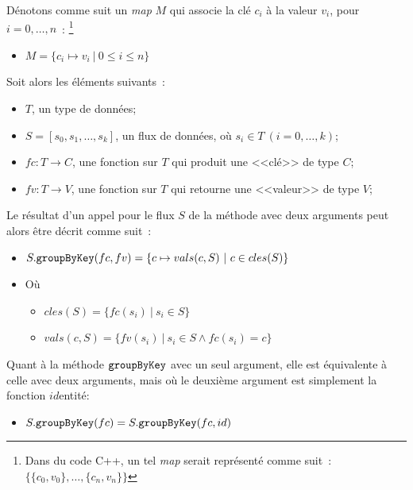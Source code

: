D\'enotons comme suit un \emph{map} $M$ qui associe la cl\'e $c_i$ \`a
la valeur $v_i$, pour $i=0, \ldots, n$~:%
%
\footnote{Dans du code C++, un tel \emph{map} serait repr\'esent\'e
comme suit~: $\{\{c_0, v_0\}, \ldots, \{c_n, v_n\}\}$}
%
\begin{itemize}
\item $M = \{ c_i \mapsto v_i~\vert~0 \leq i \leq n \}$
\end{itemize}

Soit alors les \'el\'ements suivants~: 
\begin{itemize}
\item $T$, un type de donn\'ees;

\item $S = [s_0, s_1, \ldots, s_k]$, un flux de donn\'ees, o\`u $s_i
\in T~(i=0, \ldots, k)$;

\item $fc: T \rightarrow C$, une fonction sur  $T$ qui produit une
<<cl\'e>> de type $C$;

\item $fv: T \rightarrow V$, une fonction sur $T$ qui retourne une
<<valeur>> de type $V$;


\end{itemize}


Le r\'esultat d'un appel pour le flux $S$ de la m\'ethode
 avec deux arguments peut alors \^etre d\'ecrit comme
suit~:
%
\begin{itemize}
\item $S.{\tt groupByKey}(fc, fv) = \{ c \mapsto vals(c, S)~\vert~c \in
cles(S)\}$

\item[] O\`u
\begin{itemize}
\item $cles(S) = \{ fc(s_i)~\vert~s_i \in S \}$
\item $vals(c, S) = \{ fv(s_i)~\vert~ s_i\in S \wedge fc(s_i) = c\}$
\end{itemize}

\end{itemize}


Quant \`a la m\'ethode ${\tt groupByKey}$ avec un seul argument, elle est
\'equivalente \`a celle avec deux arguments, mais o\`u le deuxi\`eme
argument est simplement la fonction $id$entit\'e:
%
\begin{itemize}
\item $S.{\tt groupByKey}(fc) = S.{\tt groupByKey}(fc, id)$
\end{itemize}




